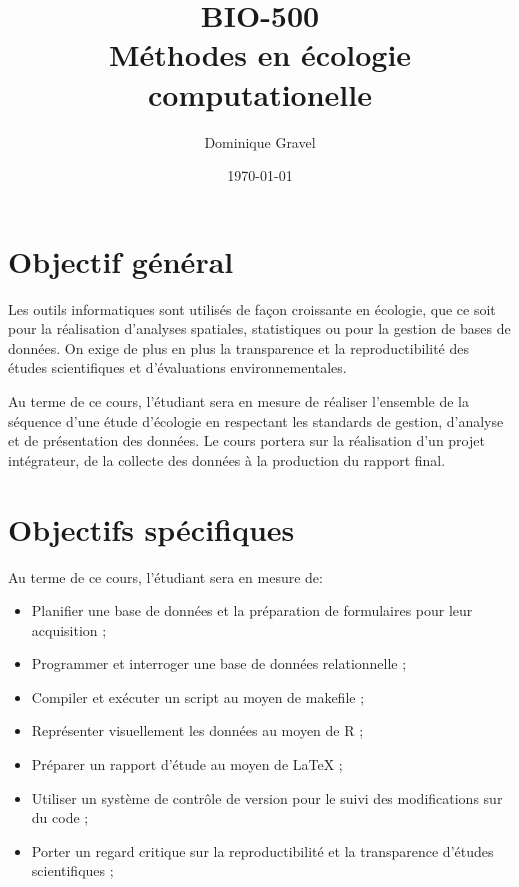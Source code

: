 \documentclass[12]{article}
\title{BIO-500 \\ Méthodes en écologie computationelle}
\date {\today}
\author {Dominique Gravel}
\affil {Département de biologie \\
Université de Sherbrooke \\ 
Local D8-3066 \\ 
819-821-8000 \#66589}
\affil {\url{dominique.gravel@usherbrooke.ca}}
\begin{document}
	\maketitle

	\section*{Objectif général}

	Les outils informatiques sont utilisés de façon croissante en écologie,
	que ce soit pour la réalisation d'analyses spatiales, statistiques ou pour
	la gestion de bases de données. On exige de plus en plus la transparence et
	la reproductibilité des études scientifiques et d'évaluations environnementales. 

	Au terme de ce cours, l'étudiant sera en mesure de réaliser l'ensemble de la 
	séquence d'une étude d'écologie en respectant les standards de gestion,  d'analyse et de présentation des données. Le cours portera sur la réalisation d'un projet intégrateur, de la collecte des données à la production du rapport final. 

	\section*{Objectifs spécifiques}

	Au terme de ce cours, l'étudiant sera en mesure de: 

	\begin{itemize}
	\renewcommand{\labelitemi}{$\bullet$}

	\item Planifier une base de données et la préparation de formulaires pour leur acquisition ; 

	\item Programmer et interroger une base de données relationnelle ;

	\item Compiler et exécuter un script au moyen de makefile ;

	\item Représenter visuellement les données au moyen de R ;

	\item Préparer un rapport d'étude au moyen de LaTeX ;

	\item Utiliser un système de contrôle de version pour le suivi des modifications sur du code ;

	\item Porter un regard critique sur la reproductibilité et la transparence d'études scientifiques ;

	\end{itemize}
\end{document}
